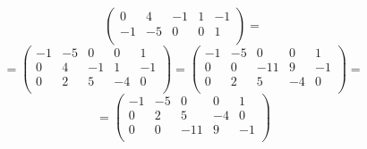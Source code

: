 \documentclass[a4paper,12pt]{article}
\begin{document}
\begin{enumerate}
\[\begin{pmatrix}
0 & 4 & -1 & 1 & -1 \\
-1 & -5 & 0 & 0 & 1 \\
\end{pmatrix}
=
\]
\[
=
\begin{pmatrix}
-1 & -5 & 0 & 0 & 1 \\
0 & 4 & -1 & 1 & -1  \\
0 & 2 & 5 & -4 & 0  \\
\end{pmatrix}
=
\begin{pmatrix}
-1 & -5 & 0 & 0 & 1 \\
0 & 0 & -11 & 9 & -1 \\
0 & 2 & 5 & -4 & 0\\
\end{pmatrix}
=
\]
\[
=
\begin{pmatrix}
-1 & -5 & 0 & 0 & 1 \\
0 & 2 & 5 & -4 & 0 \\
0 & 0 & -11 & 9 & -1  \\
\end{pmatrix}
\]


\end{enumerate}
\end{document}
